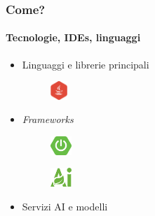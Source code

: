 \begin{frame}[t,fragile] \frametitle{Come?}
\framesubtitle{Tecnologie, IDEs, linguaggi}
\begin{itemize}[leftmargin=10pt,align=right]
    \setlength\itemsep{.7em}
    \item[\alert{\faHandORight}] Linguaggi e librerie principali
    \begin{minipage}[t]{\textwidth}
        \begin{minipage}[t]{.2\textwidth}
            \begin{figure}[ht]
                \includegraphics[height=20pt,keepaspectratio]{img/java.png}
            \end{figure}
        \end{minipage}
    \end{minipage}
    \item[\alert{\faHandORight}] \emph{Frameworks}
    \begin{minipage}[t]{\textwidth}
        \begin{minipage}[t]{.2\textwidth}
            \begin{figure}[ht]
                \includegraphics[height=20pt,keepaspectratio]{img/spring-boot.png}
            \end{figure}
        \end{minipage}
        \begin{minipage}[t]{.2\textwidth}
            \begin{figure}[ht]
                \includegraphics[height=20pt,keepaspectratio]{img/spring-ai-cut.png}
            \end{figure}
        \end{minipage}
    \end{minipage}
    \item[\alert{\faHandORight}] Servizi AI e modelli
    \begin{minipage}[t]{\textwidth}
        \begin{minipage}[t]{.2\textwidth}
            \begin{figure}[ht]

\end{figure}
\end{minipage}
\end{minipage}
\end{itemize}
\end{frame}
